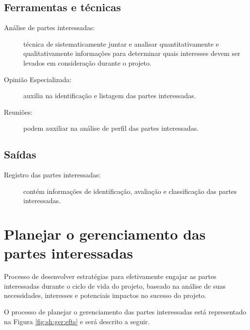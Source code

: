 \section{Ferramentas e técnicas}

\begin{description}
	
	\item[Análise de partes interessadas:] técnica de sistematicamente juntar e analisar quantitativamente e qualitativamente informações para determinar quais interesses devem ser levados em consideração durante o projeto.
	
	\item[Opinião Especializada:] auxilia na identificação e listagem das partes interessadas.
	
	\item[Reuniões:] podem auxiliar na análise de perfil das partes interessadas.

\end{description}

\section{Saídas}

\begin{description}

	\item[Registro das partes interessadas:] contém informações de identificação, avaliação e classificação das partes interessadas.
	
\end{description}

\chapter{Planejar o gerenciamento das partes interessadas}

Processo de desenvolver estratégias para efetivamente engajar as partes interessadas durante o ciclo de vida do projeto, baseado na análise de suas necessidades, interesses e potenciais impactos no sucesso do projeto.

O processo de planejar o gerenciamento das partes interessadas está representado na Figura \ref{fig:sh:ger:efts} e será descrito a seguir.

